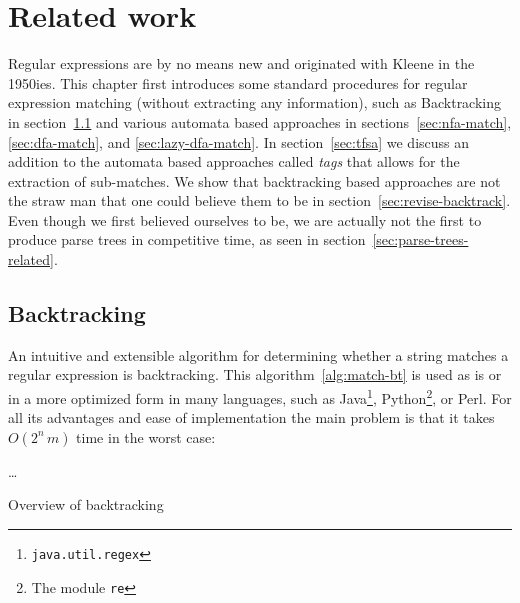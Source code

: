 \documentclass[11pt]{Thesis}
\theoremstyle{definition}
\newcommand{\Secref}[1]{section~\ref{sec:#1}}
\newcommand{\seclabel}[1]{\label{sec:#1}}
\begin{document}
\chapter{Related work}
\seclabel{related}
Regular expressions are by no means new and originated with Kleene in the 
1950ies\cite{Sips05a}. This chapter first introduces some standard 
procedures for regular expression matching (without extracting any
information), such as Backtracking in \Secref{backtracking} and various
automata based approaches in sections~\ref{sec:nfa-match}, \ref{sec:dfa-match},
and \ref{sec:lazy-dfa-match}. In \Secref{tfsa} we discuss an addition to 
the automata based approaches called \emph{tags} that allows for the extraction
of sub-matches. We show that backtracking based approaches are not the 
straw man that one could believe them to be in \Secref{revise-backtrack}.
Even though we first believed ourselves to be, we are actually not the first 
to produce parse trees in competitive time, as seen in \Secref{parse-trees-related}.

\section{Backtracking}\seclabel{backtracking}
An intuitive and extensible algorithm for determining whether a string 
matches a regular expression is backtracking. This 
algorithm~\ref{alg:match-bt} is used as is or in a more optimized form in 
many languages, such as Java\footnote{\texttt{java.util.regex}}, 
Python\footnote{The module \texttt{re}}, or Perl\cite{Cox07a}. For all its 
advantages and ease of implementation the main problem is that it takes 
$O(2^n\,m)$ time in the worst case:

\begin{algorithm*}
  \begin{algorithmic}
      \State {}
      \State {}
        \State {}
      \Else
        \State {}
      \EndIf
    \ElsIf{\dots}
      \State \dots
    \EndIf
  \EndFunction
  \end{algorithmic}
  \caption{\label{alg:match-bt}Overview of backtracking}
\end{algorithm*}
\end{document}
